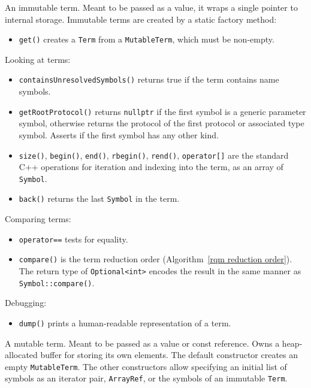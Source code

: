 \documentclass[../generics]{subfiles}
\begin{document}
An immutable term. Meant to be passed as a value, it wraps a single pointer to internal storage. Immutable terms are created by a static factory method:
\begin{itemize}
\item \texttt{get()} creates a \texttt{Term} from a \texttt{MutableTerm}, which must be non-empty.
\end{itemize}
Looking at terms:
\begin{itemize}
\item \texttt{containsUnresolvedSymbols()} returns true if the term contains name symbols.
\item \texttt{getRootProtocol()} returns \texttt{nullptr} if the first symbol is a generic parameter symbol, otherwise returns the protocol of the first protocol or associated type symbol. Asserts if the first symbol has any other kind.
\item \texttt{size()}, \texttt{begin()}, \texttt{end()}, \texttt{rbegin()}, \texttt{rend()}, \texttt{operator[]} are the standard C++ operations for iteration and indexing into the term, as an array of \texttt{Symbol}.
\item \texttt{back()} returns the last \texttt{Symbol} in the term.
\end{itemize}
Comparing terms:
\begin{itemize}
\item \texttt{operator==} tests for equality.
\item \texttt{compare()} is the term reduction order (Algorithm~\ref{rqm reduction order}). The return type of \texttt{Optional<int>} encodes the result in the same manner as \texttt{Symbol::compare()}.
\end{itemize}
Debugging:
\begin{itemize}
\item \texttt{dump()} prints a human-readable representation of a term.
\end{itemize}

A mutable term. Meant to be passed as a value or const reference. Owns a heap-allocated buffer for storing its own elements. The default constructor creates an empty \texttt{MutableTerm}. The other constructors allow specifying an initial list of symbols as an iterator pair, \texttt{ArrayRef}, or the symbols of an immutable \texttt{Term}.
\end{document}
